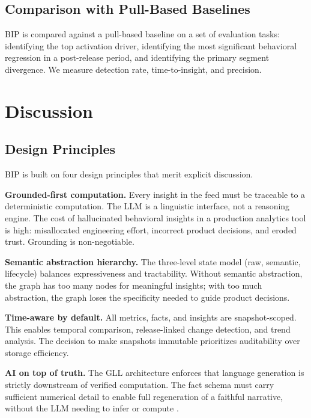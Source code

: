 \documentclass[12pt, a4paper]{article}
\begin{document}
\subsection{Comparison with Pull-Based Baselines}

BIP is compared against a pull-based baseline on a set of evaluation tasks: identifying the top activation driver, identifying the most significant behavioral regression in a post-release period, and identifying the primary segment divergence. We measure detection rate, time-to-insight, and precision.

\section{Discussion}
\label{sec:discussion}

\subsection{Design Principles}

BIP is built on four design principles that merit explicit discussion.

\textbf{Grounded-first computation.} Every insight in the feed must be traceable to a deterministic computation. The LLM is a linguistic interface, not a reasoning engine. The cost of hallucinated behavioral insights in a production analytics tool is high: misallocated engineering effort, incorrect product decisions, and eroded trust. Grounding is non-negotiable.

\textbf{Semantic abstraction hierarchy.} The three-level state model (raw, semantic, lifecycle) balances expressiveness and tractability. Without semantic abstraction, the graph has too many nodes for meaningful insights; with too much abstraction, the graph loses the specificity needed to guide product decisions.

\textbf{Time-aware by default.} All metrics, facts, and insights are snapshot-scoped. This enables temporal comparison, release-linked change detection, and trend analysis. The decision to make snapshots immutable prioritizes auditability over storage efficiency.

\textbf{AI on top of truth.} The GLL architecture enforces that language generation is strictly downstream of verified computation. The fact schema must carry sufficient numerical detail to enable full regeneration of a faithful narrative, without the LLM needing to infer or compute \cite{pan2024}.
\end{document}

